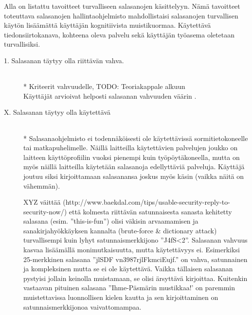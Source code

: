 \documentclass[english,gradu]{tktltiki}
\begin{document}
         Alla on listattu tavoitteet turvalliseen salasanojen käsittelyyn. Nämä tavoitteet toteuttava salasanojen hallintaohjelmisto mahdollistaisi salasanojen turvallisen käytön lisäämättä käyttäjän kognitiivista muistikuormaa. Käytettävä tiedonsiirtokanava, kohteena oleva palvelu sekä käyttäjän työasema oletetaan turvallisiksi.


         \begin{description}

           \item[1. Salasanan täytyy olla riittävän vahva.] \hfill \\
            * Kriteerit vahvuudelle, TODO: Teoriakappale alkuun \\
             Käyttäjät arvioivat helposti salasanan vahvuuden väärin \cite{password_management_strategies_06}.

           \item[X. Salasanan täytyy olla käytettävä] \hfill \\
            * Salasanaohjelmisto ei todennäköisesti ole käytettävissä sormitietokoneelle tai matkapuhelimelle. Näillä laitteilla käytettävien palvelujen joukko on laitteen käyttöprofiilin vuoksi pienempi kuin työpöytäkoneella, mutta on myös näillä laitteilla käytetään salasanoja edellyttäviä palveluja. Käyttäjä joutuu siksi kirjoittamaan salasanansa joskus myös käsin (vaikka näitä on vähemmän).

            XYZ väittää (http://www.baekdal.com/tips/usable-security-reply-to-security-now/) että kolmesta riittävän satunnaisesta sanasta kehitetty salasana (esim. ''this-is-fun'') olisi väkisin arvaamamisen ja sanakirjahyökkäyksen kannalta (brute-force \& dictionary attack) turvallisempi kuin lyhyt satunnaismerkkijono  ''J4fS<2''. Salasanan vahvuus kasvaa lisäämällä monimutkaisuutta, mutta käytettävyys ei. Esimerkiksi 25-merkkinen salasana ''jlSDF vn3987rjlFkmciEujf.'' on vahva, satunnainen ja kompleksinen mutta se ei ole käytettävä. Vaikka tällaisen salasanan pystyisi jollain keinolla muistamaan, se olisi ärsyttävä kirjoittaa. Kuitenkin vastaavan pituinen salasana ''Ihme-Päsmärin mustikkaa!' on paremmin muistettavissa luonnollisen kielen kautta ja sen kirjoittaminen on satunnaismerkkijonoa vaivattomampaa.



\end{description}
\end{document}
